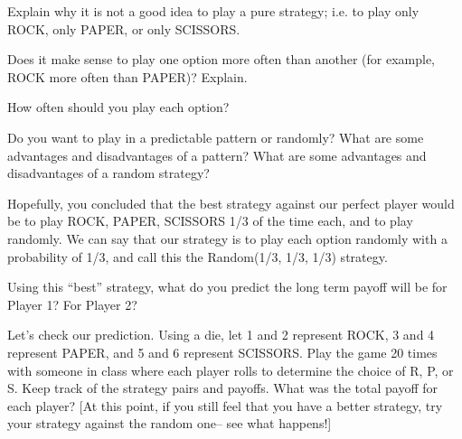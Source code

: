 
\begin{xca}\label{E:RPSpure}
Explain why it is not a good idea to play a pure strategy; i.e. to play only ROCK, only PAPER, or only SCISSORS.
\end{xca}

\begin{xca}\label{E:RPSuneven}
Does it make sense to play one option more often than another (for example, ROCK more often than PAPER)? Explain.
\end{xca}

\begin{xca}\label{E:RPSstratbest}
How often should you play each option?
\end{xca}

\begin{xca}\label{E:RPSpattern}
Do you want to play in a predictable pattern or randomly?  What are some advantages and disadvantages of a pattern? What are some advantages and disadvantages of a random strategy?
\end{xca}



Hopefully, you concluded that the best strategy against our perfect player would be to play ROCK, PAPER, SCISSORS 1/3 of the time each, and to play randomly. We can say that our strategy is to play each option randomly with a probability of 1/3, and call this the Random(1/3, 1/3, 1/3) strategy.


\begin{xca}\label{E:RPSltpayoff}
Using this ``best'' strategy, what do you predict the long term payoff will be for Player 1? For Player 2?
\end{xca}

\begin{xca}\label{E:RPSdice}
Let's check our prediction. Using a die, let 1 and 2 represent ROCK, 3 and 4 represent PAPER, and 5 and 6 represent SCISSORS. Play the game 20 times with someone in class where each player rolls to determine the choice of R, P, or S. Keep track of the strategy pairs and payoffs. What was the total payoff for each player? [At this point, if you still feel that you have a better strategy, try your strategy against the random one-- see what happens!]
\end{xca}

